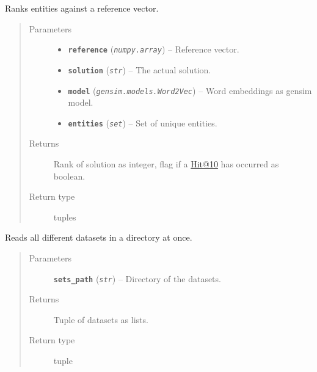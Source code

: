 \documentclass[letterpaper,10pt,english]{sphinxmanual}
\begin{document}
\begin{fulllineitems}
\label{src.trans_e:src.trans_e.trans_we.rank_entities}
Ranks entities against a reference vector.
\begin{quote}\begin{description}
\item[{Parameters}] \leavevmode\begin{itemize}
\item {} 
\textbf{\texttt{reference}} (\emph{\texttt{numpy.array}}) -- Reference vector.

\item {} 
\textbf{\texttt{solution}} (\emph{\texttt{str}}) -- The actual solution.

\item {} 
\textbf{\texttt{model}} (\emph{\texttt{gensim.models.Word2Vec}}) -- Word embeddings as gensim model.

\item {} 
\textbf{\texttt{entities}} (\emph{\texttt{set}}) -- Set of unique entities.

\end{itemize}

\item[{Returns}] \leavevmode
Rank of solution as integer, flag if a \href{mailto:Hit@10}{Hit@10} has occurred as boolean.

\item[{Return type}] \leavevmode
tuples

\end{description}\end{quote}

\end{fulllineitems}


\begin{fulllineitems}
\label{src.trans_e:src.trans_e.trans_we.read_freebase_data}
Reads all different datasets in a directory at once.
\begin{quote}\begin{description}
\item[{Parameters}] \leavevmode
\textbf{\texttt{sets\_path}} (\emph{\texttt{str}}) -- Directory of the datasets.

\item[{Returns}] \leavevmode
Tuple of datasets as lists.

\item[{Return type}] \leavevmode
tuple

\end{description}\end{quote}

\end{fulllineitems}
\end{document}
